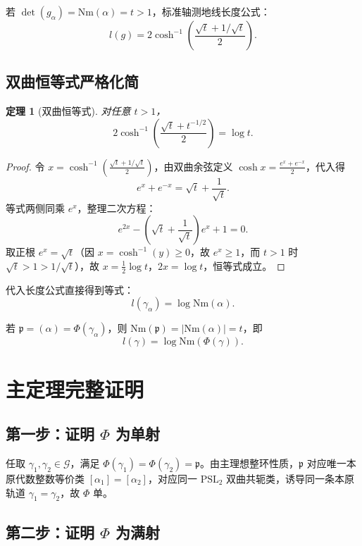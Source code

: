 \documentclass[12pt,a4paper]{article}
\newtheorem{theorem}{定理}[section]
\begin{document}
若 $\det(g_\alpha) = \mathrm{Nm}(\alpha) = t > 1$，标准轴测地线长度公式：
\[
l(g) = 2\cosh^{-1}\left(\frac{\sqrt{t} + 1/\sqrt{t}}{2}\right).
\]

\subsection{双曲恒等式严格化简}

\begin{theorem}[双曲恒等式]
对任意 $t > 1$，
\[
2\cosh^{-1}\left(\frac{\sqrt{t} + t^{-1/2}}{2}\right) = \log t.
\]
\end{theorem}

\begin{proof}
令 $x = \cosh^{-1}\left(\frac{\sqrt{t} + 1/\sqrt{t}}{2}\right)$，由双曲余弦定义 $\cosh x = \frac{e^x + e^{-x}}{2}$，代入得
\[
e^x + e^{-x} = \sqrt{t} + \frac{1}{\sqrt{t}}.
\]
等式两侧同乘 $e^x$，整理二次方程：
\[
e^{2x} - \left(\sqrt{t} + \frac{1}{\sqrt{t}}\right)e^x + 1 = 0.
\]
取正根 $e^x = \sqrt{t}$（因 $x = \cosh^{-1}(y) \geq 0$，故 $e^x \geq 1$，而 $t > 1$ 时 $\sqrt{t} > 1 > 1/\sqrt{t}$），故 $x = \frac{1}{2}\log t$，$2x = \log t$，恒等式成立。
\end{proof}

代入长度公式直接得到等式：
\[
l(\gamma_\alpha) = \log \mathrm{Nm}(\alpha).
\]

若 $\mathfrak{p} = (\alpha) = \Phi(\gamma_\alpha)$，则 $\mathrm{Nm}(\mathfrak{p}) = |\mathrm{Nm}(\alpha)| = t$，即
\[
l(\gamma) = \log \mathrm{Nm}(\Phi(\gamma)).
\]

\section{主定理完整证明}

\subsection{第一步：证明 $\Phi$ 为单射}

任取 $\gamma_1, \gamma_2 \in \mathcal{G}$，满足 $\Phi(\gamma_1) = \Phi(\gamma_2) = \mathfrak{p}$。由主理想整环性质，$\mathfrak{p}$ 对应唯一本原代数整数等价类 $[\alpha_1] = [\alpha_2]$，对应同一 $\mathrm{PSL}_2$ 双曲共轭类，诱导同一条本原轨道 $\gamma_1 = \gamma_2$，故 $\Phi$ 单。

\subsection{第二步：证明 $\Phi$ 为满射}
\end{document}
